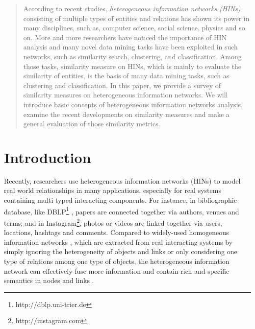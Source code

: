 \documentclass{acm_proc_article-csis8101}
\begin{document}
%
\maketitle
\begin{abstract}
According to recent studies, {\em heterogeneous information networks (HINs)} consisting of multiple types of entities and relations has shown its power in many disciplines, such as, computer science, social science, physics and so on. More and more researchers have noticed the importance of HIN analysis and many novel data mining tasks have been exploited in such networks, such as similarity search, clustering, and classification. Among those tasks, similarity measure on HINs, which is mainly to evaluate the similarity of entities, is the basis of many data mining tasks, such as clustering and classification. In this paper, we provide a survey of similarity measures on heterogeneous information networks. We will introduce basic concepts of heterogeneous information networks analysis, examine the recent developments on similarity measures and make a general evaluation of those similarity metrics.


\end{abstract}


\section{Introduction}
Recently, researchers use heterogeneous information networks (HINs) to model real world relationships in many applications, especially for real systems containing multi-typed interacting components. For instance, in bibliographic database, like DBLP\footnote{http://dblp.uni-trier.de} \cite{sun2013mining}, papers are connected together via authors, venues and terms; and in Instagram\footnote{http://instagram.com}, photos or videos are linked together via users, locations, hashtags and comments. Compared to widely-used homogeneous information networks \cite{leroy2010cold, lichtenwalter2010new}, which are extracted from real interacting systems by simply ignoring the heterogeneity of objects and links or only considering one type of relations among one type of objects, the heterogeneous information network can effectively fuse more information and contain rich and specific semantics in nodes and links \cite{shi2017survey}.
\end{document}
